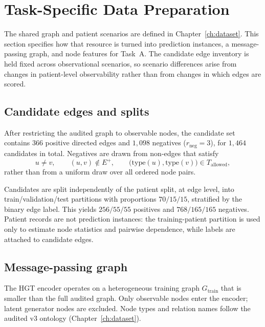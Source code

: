 \section{Task-Specific Data Preparation}
\label{sec:taskA-data}

The shared graph and patient scenarios are defined in Chapter~\ref{ch:dataset}.
This section specifies how that resource is turned into prediction instances, a message-passing graph, and node features for Task~A.
The candidate edge inventory is held fixed across observational scenarios, so scenario differences arise from changes in patient-level observability rather than from changes in which edges are scored.

\subsection{Candidate edges and splits}
\label{sec:taskA-candidates}

After restricting the audited graph to observable nodes, the candidate set contains $366$ positive directed edges and $1{,}098$ negatives ($r_{\mathrm{neg}}=3$), for $1{,}464$ candidates in total.
Negatives are drawn from non-edges that satisfy
\begin{equation}
\label{eq:taskA-neg-conditions}
u\neq v,\qquad (u,v)\notin E^{+},\qquad \bigl(\mathrm{type}(u),\mathrm{type}(v)\bigr)\in T_{\mathrm{allowed}},
\end{equation}
rather than from a uniform draw over all ordered node pairs.

Candidates are split independently of the patient split, at edge level, into train/validation/test partitions with proportions $70/15/15$, stratified by the binary edge label.
This yields $256/55/55$ positives and $768/165/165$ negatives.
Patient records are not prediction instances: the training-patient partition is used only to estimate node statistics and pairwise dependence, while labels are attached to candidate edges.

\subsection{Message-passing graph}
\label{sec:taskA-mp-graph}

The HGT encoder operates on a heterogeneous training graph $G_{\mathrm{train}}$ that is smaller than the full audited graph.
Only observable nodes enter the encoder; latent generator nodes are excluded.
Node types and relation names follow the audited v3 ontology (Chapter~\ref{ch:dataset}).

